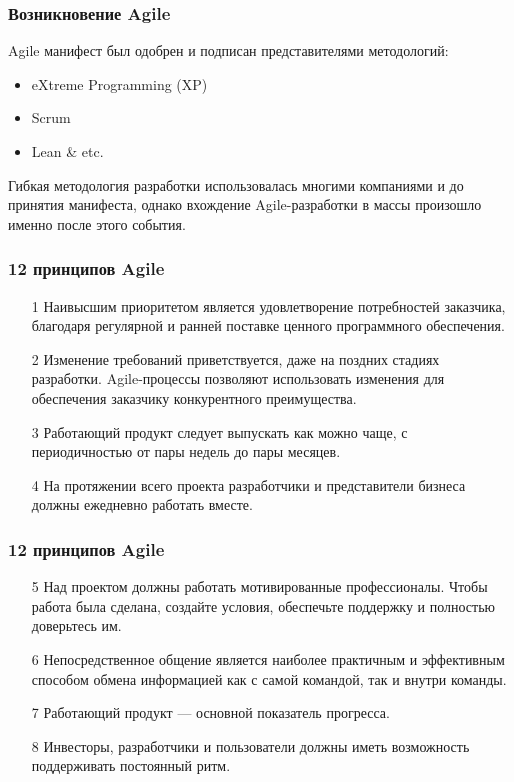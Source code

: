 \documentclass{../industrial-development}
\begin{document}
\begin{frame} \frametitle{Возникновение Agile} 
Agile манифест был одобрен и подписан представителями методологий: 
\begin{itemize}
  \item eXtreme Programming (XP)
	\item Scrum
	\item Lean \& etc.
	\end{itemize}
Гибкая методология разработки использовалась многими компаниями и до принятия манифеста, однако вхождение Agile-разработки в массы произошло именно после этого события.
\end{frame}


\begin{frame} \frametitle{12 принципов  Agile}
\begin{enumerate}
\item[1] Наивысшим приоритетом является удовлетворение потребностей 
заказчика, благодаря регулярной и ранней поставке ценного программного 
обеспечения.
\item[2] Изменение требований приветствуется, даже на поздних стадиях разработки. 
Agile-процессы позволяют использовать изменения для обеспечения заказчику
конкурентного преимущества.
\item[3] Работающий продукт следует выпускать как можно чаще, с периодичностью 
от пары недель до пары месяцев.
\item[4] На протяжении всего проекта разработчики и представители бизнеса должны 
ежедневно работать вместе.
\end{enumerate}
\end{frame}


\begin{frame} \frametitle{12 принципов  Agile}
\begin{enumerate}

\item[5] Над проектом должны работать мотивированные профессионалы. Чтобы 
работа была сделана, создайте условия, обеспечьте поддержку и полностью 
доверьтесь им.
\item[6] Непосредственное общение является наиболее практичным и эффективным 
способом обмена информацией как с самой командой, так и внутри команды.
\item[7] Работающий продукт — основной показатель прогресса.
\item[8] Инвесторы, разработчики и пользователи должны иметь возможность 
поддерживать постоянный ритм.
\end{enumerate}
\end{frame}
\end{document}
